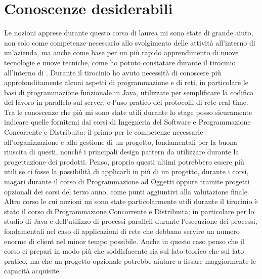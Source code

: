 \section{Conoscenze desiderabili}
Le nozioni apprese durante questo corso di laurea mi sono state di grande aiuto, non solo come competenze necessario allo svolgimento delle attività all'interno di un'azienda, ma anche come base per un più rapido apprendimento di nuove tecnologie e nuove tecniche, come ho potuto constatare durante il tirocinio all'interno di \nomeAzienda{}. Durante il tirocinio ho avuto necessità di conoscere più approfonditamente alcuni aspetti di programmazione e di reti, in particolare le basi di programmazione funzionale in Java, utilizzate per semplificare la codifica del lavoro in parallelo sul server, e l'uso pratico dei protocolli di rete real-time.
\\
Tra le conoscenze che più mi sono state utili durante lo stage posso sicuramente indicare quelle fornitemi dai corsi di Ingegneria del Software e Programmazione Concorrente e Distribuita: il primo per le competenze necessarie all'organizzazione e alla gestione di un progetto, fondamentali per la buona riuscita di questi, nonché i principali design pattern da utilizzare durante la progettazione dei prodotti. Penso, proprio questi ultimi potrebbero essere più utili se ci fosse la possibilità di applicarli in più di un progetto, durante i corsi, magari durante il corso di Programmazione ad Oggetti oppure tramite progetti opzionali dei corsi del terzo anno, come punti aggiuntivi alla valutazione finale. Altro corso le cui nozioni mi sono state particolarmente utili durante il tirocinio è stato il corso di Programmazione Concorrente e Distribuita; in particolare per lo studio di Java e dell'utilizzo di processi paralleli durante l'esecuzione dei processi, fondamentali nel caso di applicazioni di rete che debbano servire un numero enorme di client nel minor tempo possibile. Anche in questo caso penso che il corso ci prepari in modo più che soddisfacente sia sul lato teorico che sul lato pratico, ma che un progetto opzionale potrebbe aiutare a fissare maggiormente le capacità acquisite.

